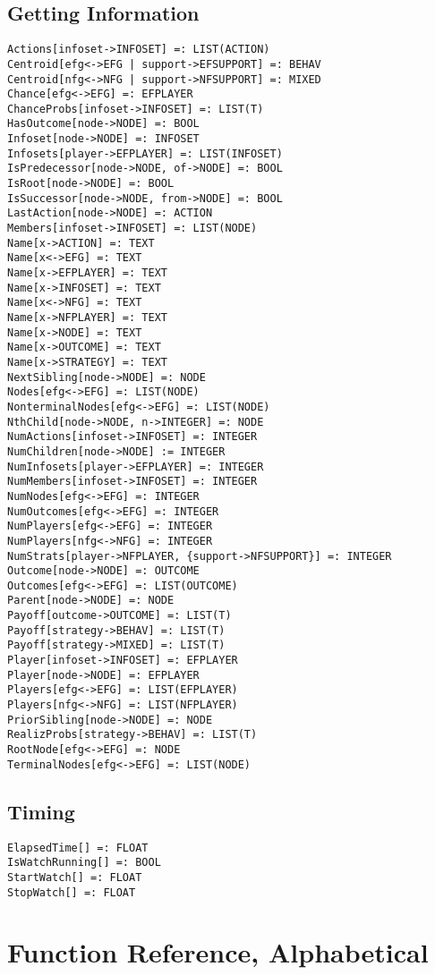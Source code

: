 \subsection{Getting Information}

\begin{verbatim}
Actions[infoset->INFOSET] =: LIST(ACTION)
Centroid[efg<->EFG | support->EFSUPPORT] =: BEHAV
Centroid[nfg<->NFG | support->NFSUPPORT] =: MIXED
Chance[efg<->EFG] =: EFPLAYER
ChanceProbs[infoset->INFOSET] =: LIST(T)
HasOutcome[node->NODE] =: BOOL
Infoset[node->NODE] =: INFOSET
Infosets[player->EFPLAYER] =: LIST(INFOSET)
IsPredecessor[node->NODE, of->NODE] =: BOOL
IsRoot[node->NODE] =: BOOL
IsSuccessor[node->NODE, from->NODE] =: BOOL
LastAction[node->NODE] =: ACTION
Members[infoset->INFOSET] =: LIST(NODE)
Name[x->ACTION] =: TEXT
Name[x<->EFG] =: TEXT
Name[x->EFPLAYER] =: TEXT
Name[x->INFOSET] =: TEXT
Name[x<->NFG] =: TEXT
Name[x->NFPLAYER] =: TEXT
Name[x->NODE] =: TEXT
Name[x->OUTCOME] =: TEXT
Name[x->STRATEGY] =: TEXT
NextSibling[node->NODE] =: NODE
Nodes[efg<->EFG] =: LIST(NODE)
NonterminalNodes[efg<->EFG] =: LIST(NODE)
NthChild[node->NODE, n->INTEGER] =: NODE
NumActions[infoset->INFOSET] =: INTEGER
NumChildren[node->NODE] := INTEGER
NumInfosets[player->EFPLAYER] =: INTEGER
NumMembers[infoset->INFOSET] =: INTEGER
NumNodes[efg<->EFG] =: INTEGER
NumOutcomes[efg<->EFG] =: INTEGER
NumPlayers[efg<->EFG] =: INTEGER
NumPlayers[nfg<->NFG] =: INTEGER
NumStrats[player->NFPLAYER, {support->NFSUPPORT}] =: INTEGER
Outcome[node->NODE] =: OUTCOME
Outcomes[efg<->EFG] =: LIST(OUTCOME)
Parent[node->NODE] =: NODE
Payoff[outcome->OUTCOME] =: LIST(T)
Payoff[strategy->BEHAV] =: LIST(T)
Payoff[strategy->MIXED] =: LIST(T)
Player[infoset->INFOSET] =: EFPLAYER
Player[node->NODE] =: EFPLAYER
Players[efg<->EFG] =: LIST(EFPLAYER)
Players[nfg<->NFG] =: LIST(NFPLAYER)
PriorSibling[node->NODE] =: NODE
RealizProbs[strategy->BEHAV] =: LIST(T)
RootNode[efg<->EFG] =: NODE
TerminalNodes[efg<->EFG] =: LIST(NODE)
\end{verbatim}

\subsection{Timing}

\begin{verbatim}
ElapsedTime[] =: FLOAT
IsWatchRunning[] =: BOOL
StartWatch[] =: FLOAT
StopWatch[] =: FLOAT
\end{verbatim}


\section{Function Reference, Alphabetical}


